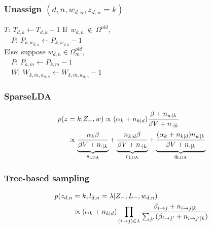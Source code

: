 
\begin{frame}

\frametitle{Unassign $(d,n,w_{d,n},z_{d,n} = k)$} 
\begin{algorithmic}[1]
\STATE $T:~T_{d,k} \leftarrow T_{d,k}-1$
\STATE If~$w_{d,n}~\notin~\Omega^{old}$,\\
~~$P:~P_{k, w_{d,n}} \leftarrow P_{k, w_{d,n}} - 1$\\
\STATE Else: suppose $w_{d,n} \in \Omega^{old}_m$,\\
~~$P:~P_{k, m} \leftarrow P_{k, m} - 1$\\
~~$W:~W_{k,m,w_{d,n}} \leftarrow W_{k,m,w_{d,n}} - 1$
\end{algorithmic}
	

\end{frame}


\begin{frame}

	\frametitle{SparseLDA}

\begin{align}	
	\label{eq:fast-lda}
p(z &= k | Z_{-}, w) \propto (\alpha_k + n_{k|d})\frac{\beta + n_{w|k}}{\beta V + n_{\cdot |k}} \\
&\propto \explain{$s_{\textsc{LDA}}$}{\frac{\alpha_k \beta}{\beta V + n_{\cdot |k}}} + \explain{$r_{\textsc{LDA}}$}{\frac{n_{k|d} \beta}{\beta V + n_{\cdot |k}}}
+ \explain{$q_{\textsc{LDA}}$}{\frac{(\alpha_k + n_{k|d})n_{w | k}}{\beta V +
    n_{\cdot |k}}} \notag
\end{align}

\end{frame}


\begin{frame}

	\frametitle{Tree-based sampling}
	
	\begin{align}
\label{eq:naive-ldawn}
p(z_{d,n} &= k, l_{d,n} = \lambda | Z_{-}, L_{-}, w_{d,n}) \\
&\propto (\alpha_k + n_{k|d})
\prod_{(i \rightarrow j)\in \lambda} \frac{\beta_{i \rightarrow j} + n_{i \rightarrow j | k}}
{\sum_{j\prime}{(\beta_{i \rightarrow j'} + n_{i \rightarrow j' | k})}}  \notag
\end{align}

\end{frame}


